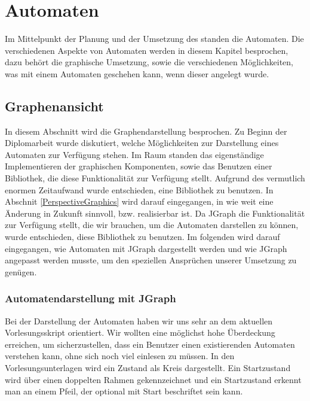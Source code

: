 

\chapter{Automaten}\label{Machines}

Im Mittelpunkt der Planung und der Umsetzung des \gtitools standen die
Automaten. Die verschiedenen Aspekte von Automaten werden in diesem Kapitel
besprochen, dazu behört die graphische Umsetzung, sowie die verschiedenen
Möglichkeiten, was mit einem Automaten geschehen kann, wenn dieser angelegt
wurde.


\section{Graphenansicht}\label{Graph}

In diesem Abschnitt wird die Graphendarstellung besprochen. Zu Beginn der
Diplomarbeit wurde diskutiert, welche Möglichkeiten zur Darstellung eines
Automaten zur Verfügung stehen. Im Raum standen das eigenständige
Implementieren der graphischen Komponenten, sowie das Benutzen einer
Bibliothek, die diese Funktionalität zur Verfügung stellt. Aufgrund des
vermutlich enormen Zeitaufwand wurde entschieden, eine Bibliothek zu benutzen.
In Abschnit \ref{PerspectiveGraphics} wird darauf eingegangen, in wie weit eine
Änderung in Zukunft sinnvoll, bzw. realisierbar ist. Da JGraph die
Funktionalität zur Verfügung stellt, die wir brauchen, um die Automaten
darstellen zu können, wurde entschieden, diese Bibliothek zu benutzen. Im
folgenden wird darauf eingegangen, wie Automaten mit JGraph dargestellt werden
und wie JGraph angepasst werden musste, um den speziellen Ansprüchen unserer
Umsetzung zu genügen.


\subsection{Automatendarstellung mit JGraph}\label{GraphJGraph}

Bei der Darstellung der Automaten haben wir uns sehr an dem aktuellen
Vorlesungsskript orientiert. Wir wollten eine möglichst hohe Überdeckung
erreichen, um sicherzustellen, dass ein Benutzer einen existierenden Automaten
verstehen kann, ohne sich noch viel einlesen zu müssen. In den
Vorlesungsunterlagen wird ein Zustand als Kreis dargestellt. Ein Startzustand
wird über einen doppelten Rahmen gekennzeichnet und ein Startzustand erkennt man
an einem Pfeil, der optional mit Start beschriftet sein kann.\vspace{10pt}

